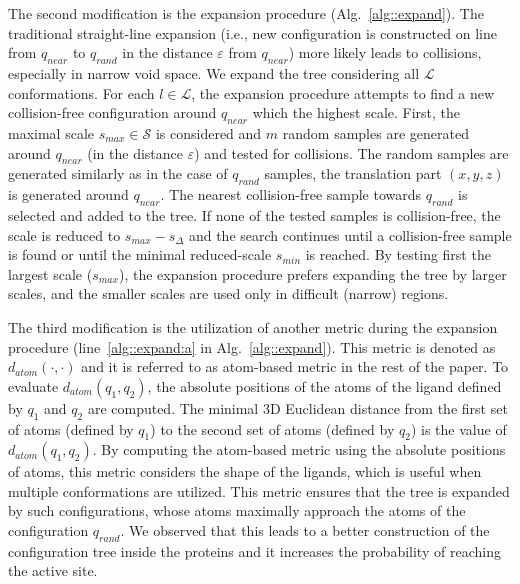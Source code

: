 \documentclass[usletter, 10pt, conference]{ieeeconf} %
\def\qrand{q_{rand}}
\def\qnear{q_{near}}
\def\da{d_{atom}}
\def\smin{s_{min}}
\def\smax{s_{max}}
\def\sdelta{s_{\Delta}}
\def\L{\mathcal{L}}
\def\S{\mathcal{S}}
\begin{document}
{The second modification is the expansion procedure (Alg.~\ref{alg::expand}). %
The traditional straight-line expansion (i.e., new configuration is constructed on line from $\qnear$ to $\qrand$ in the distance
$\varepsilon$ from $\qnear$) more likely leads to collisions, especially in narrow void space.
We expand the tree considering all $\L$ conformations.
For each $l \in \L$, the expansion procedure attempts to find a new collision-free configuration around $\qnear$ which the highest scale.
First, the maximal scale $\smax \in \S$ is considered and $m$ random samples are generated around $\qnear$ (in the distance $\varepsilon$) 
and tested for collisions.
The random samples are generated similarly as in the case of $\qrand$ samples, the translation part $(x,y,z)$ is generated around $\qnear$.
The nearest collision-free sample towards $\qrand$ is selected and added to the tree.
If none of the tested samples is collision-free, the scale is reduced to $\smax-\sdelta$ and the search continues
until a collision-free sample is found or until the minimal reduced-scale $\smin$ is reached.
By testing first the largest scale ($\smax$), the expansion procedure prefers expanding the tree by larger scales, and the
smaller scales are used only in difficult (narrow) regions.

The third modification is the utilization of another metric during the expansion procedure (line~\ref{alg::expand:a} in Alg.~\ref{alg::expand}).
This metric is denoted as $\da(\cdot,\cdot)$ and it is referred to as atom-based metric in the rest of the paper.
To evaluate $\da(q_1,q_2)$, the absolute positions of the atoms of the ligand defined by $q_1$ and $q_2$ are computed.
The minimal 3D Euclidean distance from the first set of atoms (defined by $q_1$) to the second set of atoms (defined by $q_2$) is the value of 
$\da(q_1,q_2)$.
By computing the atom-based metric using the absolute positions of atoms, this metric considers the shape of the ligands, which
is useful when multiple conformations are utilized.
This metric ensures that the tree is expanded by such configurations, whose atoms maximally approach
the atoms of the configuration $\qrand$.
We observed that this leads to a better construction of the configuration tree inside the proteins and it increases the probability
of reaching the active site.

}
\end{document}
